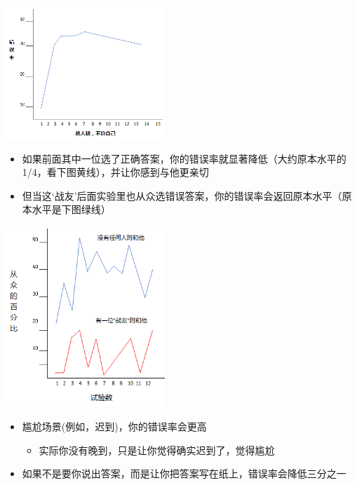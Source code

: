 

\includegraphics[width=6cm]{Asch3Screenshot_2022-07-08_2013411.png}

\begin{itemize}
\tightlist
\item
  如果前面其中一位选了正确答案，你的错误率就显著降低（大约原本水平的1/4，看下图黄线），并让你感到与他更亲切
\item
  但当这`战友'后面实验里也从众选错误答案，你的错误率会返回原本水平（原本水平是下图绿线）
\end{itemize}



\includegraphics[width=6cm]{Asch4Screenshot_2022-07-08_2015021.png}

\begin{itemize}
\tightlist
\item
  尴尬场景(例如，迟到)，你的错误率会更高

  \begin{itemize}
  \tightlist
  \item
    实际你没有晚到，只是让你觉得确实迟到了，觉得尴尬
  \end{itemize}
\item
  如果不是要你说出答案，而是让你把答案写在纸上，错误率会降低三分之一
\end{itemize}

